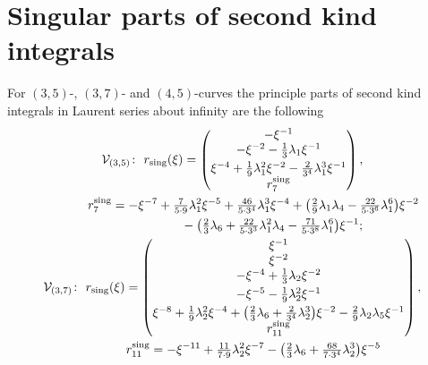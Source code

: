 \documentclass[pdftex]{sigma}
\numberwithin{equation}{section}
\begin{document}
\section{Singular parts of second kind integrals}\label{A:singPart}
For $(3,5)$-, $(3,7)$- and $(4,5)$-curves the principle parts of second kind integrals in Laurent series about infinity are the following
\begin{gather*}
 \mathcal{V}_{(3,5)}\colon \ r_{\textup{sing}} (\xi) = \begin{pmatrix} -\xi^{-1} \\
 -\xi^{-2} - \frac{1}{3}\lambda_1 \xi^{-1} \vspace{1mm}\\
 \xi^{-4} + \frac{1}{9}\lambda_1^2 \xi^{-2} - \frac{2}{3^4}\lambda_1^3 \xi^{-1} \\
 r_7^{\textup{sing}} \end{pmatrix}, \\ %
 \hphantom{\mathcal{V}_{(3,5)}\colon}{} \ r_7^{\textup{sing}} =
 -\xi^{-7} + \tfrac{7}{5\cdot 9} \lambda_1^2 \xi^{-5} + \tfrac{46}{5\cdot 3^4} \lambda_1^3 \xi^{-4}
 + \big(\tfrac{2}{9}\lambda_1 \lambda_4 - \tfrac{22}{5\cdot 3^6} \lambda_1^6\big) \xi^{-2} \notag \\
\hphantom{\mathcal{V}_{(3,5)}\colon \ r_7^{\textup{sing}} =}{}
 - \big(\tfrac{2}{3} \lambda_6 + \tfrac{22}{5 \cdot 3^3} \lambda_1^2 \lambda_4
 -\tfrac{71}{5\cdot 3^8} \lambda_1^6\big) \xi^{-1}; \notag\\
 \mathcal{V}_{(3,7)}\colon \ r_{\textup{sing}} (\xi) =\begin{pmatrix} \xi^{-1} \\
 \xi^{-2} \\ -\xi^{-4} + \tfrac{1}{3}\lambda_2 \xi^{-2} \vspace{1mm}\\ -\xi^{-5} - \tfrac{1}{9}\lambda_2^2 \xi^{-1}\vspace{1mm}\\
 \xi^{-8} + \tfrac{1}{9}\lambda_2^2 \xi^{-4}
 + \big(\tfrac{2}{3}\lambda_6 + \tfrac{2}{3^4}\lambda_2^3\big) \xi^{-2}
 - \tfrac{2}{9}\lambda_2 \lambda_5 \xi^{-1}
 \\ r_{11}^{\textup{sing}} \end{pmatrix},\\ %
\hphantom{\mathcal{V}_{(3,7)}\colon}{} \ r_{11}^{\textup{sing}} = -\xi^{-11} +\tfrac{11}{7\cdot 9} \lambda_2^2 \xi^{-7} -
 \big(\tfrac{2}{3} \lambda_6 + \tfrac{68}{7\cdot 3^4} \lambda_2^3 \big)\xi^{-5}

\end{gather*}
\end{document}

